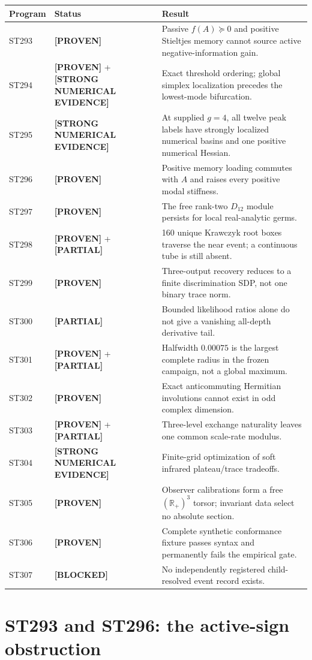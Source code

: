 \documentclass[11pt,a4paper]{article}
\newcommand{\Proven}{\textcolor{proved}{\textbf{[PROVEN]}}}
\newcommand{\Evidence}{\textcolor{conditional}{\textbf{[STRONG NUMERICAL EVIDENCE]}}}
\newcommand{\Partial}{\textcolor{conditional}{\textbf{[PARTIAL]}}}
\newcommand{\Blocked}{\textcolor{blocked}{\textbf{[BLOCKED]}}}
\begin{document}
\begin{longtable}{p{}p{}p{}}
\toprule Program&Status&Result\\\midrule\endhead
ST293&\Proven&Passive $f(A)\succeq0$ and positive Stieltjes memory cannot source active negative-information gain.\\
ST294&\Proven{} + \Evidence&Exact threshold ordering; global simplex localization precedes the lowest-mode bifurcation.\\
ST295&\Evidence&At supplied $g=4$, all twelve peak labels have strongly localized numerical basins and one positive numerical Hessian.\\
ST296&\Proven&Positive memory loading commutes with $A$ and raises every positive modal stiffness.\\
ST297&\Proven&The free rank-two $D_{12}$ module persists for local real-analytic germs.\\
ST298&\Proven{} + \Partial&160 unique Krawczyk root boxes traverse the near event; a continuous tube is still absent.\\
ST299&\Proven&Three-output recovery reduces to a finite discrimination SDP, not one binary trace norm.\\
ST300&\Partial&Bounded likelihood ratios alone do not give a vanishing all-depth derivative tail.\\
ST301&\Proven{} + \Partial&Halfwidth $0.00075$ is the largest complete radius in the frozen campaign, not a global maximum.\\
ST302&\Proven&Exact anticommuting Hermitian involutions cannot exist in odd complex dimension.\\
ST303&\Proven{} + \Partial&Three-level exchange naturality leaves one common scale-rate modulus.\\
ST304&\Evidence&Finite-grid optimization of soft infrared plateau/trace tradeoffs.\\
ST305&\Proven&Observer calibrations form a free $(\mathbb R_+)^3$ torsor; invariant data select no absolute section.\\
ST306&\Proven&Complete synthetic conformance fixture passes syntax and permanently fails the empirical gate.\\
ST307&\Blocked&No independently registered child-resolved event record exists.\\
\bottomrule\end{longtable}\normalsize

\section{ST293 and ST296: the active-sign obstruction}
\end{document}
